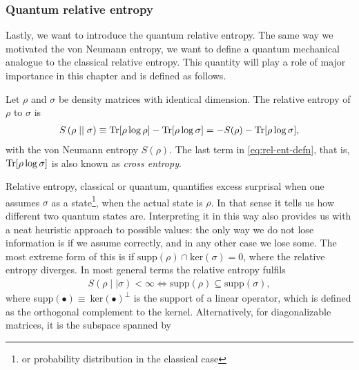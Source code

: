 \subsubsection{Quantum relative entropy}
Lastly, we want to introduce the quantum relative entropy. 
The same way we
motivated the von Neumann entropy, we want to define a quantum mechanical
analogue to the classical relative entropy. This quantity will play a role of
major importance in this chapter and is defined as follows.
\begin{defn}\label{defn:rel-ent}
  Let $\rho$ and $\sigma$ be density matrices with identical dimension. The
  relative entropy of $\rho$ to $\sigma$ is
  \begin{align}\label{eq:rel-ent-defn}
    S\left(\rho\mid\mid\sigma\right) \equiv \Tr[\rho\log\rho] -
    \Tr[\rho\log\sigma] = -S(\rho) - \Tr[\rho\log\sigma]
  ,\end{align}
  with the von Neumann entropy $S(\rho)$.
  The last term in \cref{eq:rel-ent-defn}, that is, $\Tr[\rho\log\sigma]$ is also
  known as \emph{cross entropy}. 
\end{defn}
Relative entropy, classical or quantum, quantifies excess surprisal when
one assumes $\sigma$ as a state\footnote{or probability distribution in the
classical case}, when the actual state is $\rho$. In that sense it tells us how
different two quantum states are. Interpreting it in this way also provides us
with a neat heuristic approach to possible values: the only way we do not lose
information is if we assume correctly, and in any other case we lose some. The
most extreme form of this is if $\mathrm{supp}(\rho)\cap\mathrm{ker}(\sigma)={0}$, where the
relative entropy diverges. In most general terms the relative entropy fulfils
\begin{align}\label{eq:inf-cond}
  S(\rho\mid\mid\sigma) < \infty \Longleftrightarrow \mathrm{supp}(\rho) \subseteq
  \mathrm{supp}(\sigma)
,\end{align}
where supp$(\bullet)\equiv\ $ker$(\bullet)^\perp$ is the support of a linear
operator, which is defined as the orthogonal complement to the kernel.
Alternatively, for diagonalizable matrices, it is the subspace spanned by

